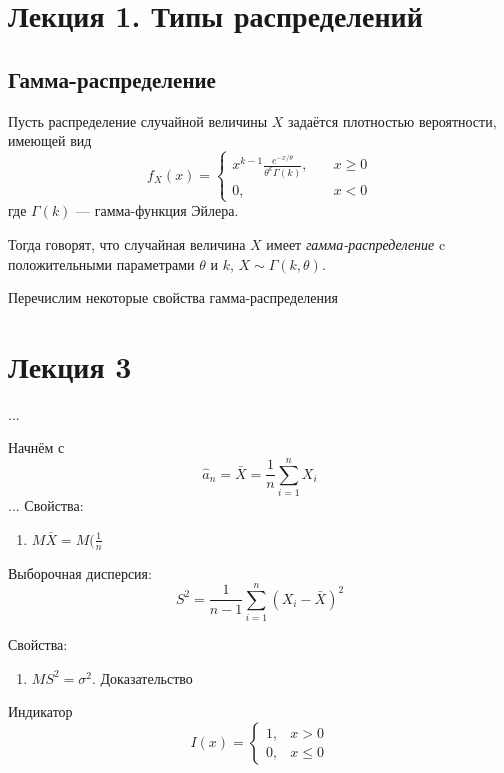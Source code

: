\section{Лекция 1. Типы распределений}
\subsection{Гамма-распределение}
\begin{definition}
Пусть распределение случайной величины $ X $ задаётся плотностью вероятности,
имеющей вид 
\[
	f_X(x) = \begin{cases} x^{k-1} \frac{e^{-x/\theta}}{\theta^k \Gamma(k)}, \quad
			&x \geqslant 0 \\
	0, \quad &x < 0 \end{cases}
\]
где $ \Gamma(k) $ --- гамма-функция Эйлера.

Тогда говорят, что случайная величина $ X $ имеет \emph{гамма-распределение} c
положительными параметрами $ \theta $ и $ k $, $ X \sim \Gamma(k, \theta) $.
\end{definition}

Перечислим некоторые свойства гамма-распределения



\section{Лекция 3}
...


Начнём с 
\[
	\hat a_n = \bar X = \frac{1}{n} \sum_{i=1}^{n} X_i
\]
...
Свойства: \begin{enumerate}
\item $ M \bar X = M(\frac{1}{n} $
\end{enumerate}

Выборочная дисперсия: 
\[
	S^2 = \frac{1}{n-1} \sum^n_{i=1} (X_i - \bar X)^2
\]

Свойства: \begin{enumerate}
	\item $ MS^2 = \sigma^2 $. Доказательство
\end{enumerate}

Индикатор  
\[
	I(x) = \begin{cases} 1, &x > 0 \\ 0, &x\leqslant0\end{cases}
\]


